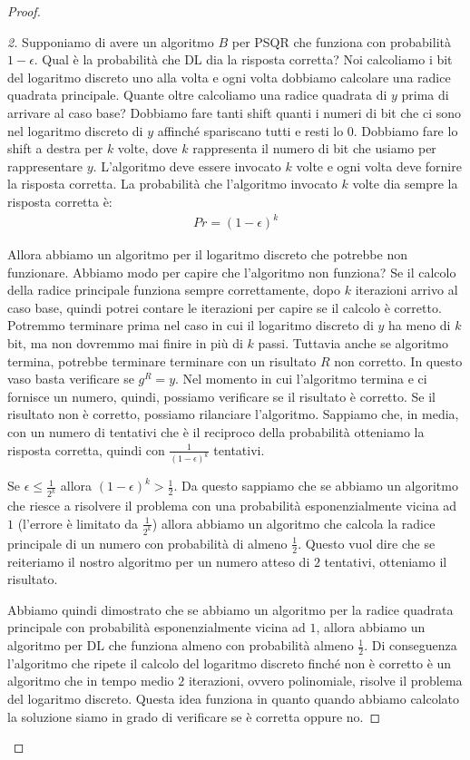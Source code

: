 \begin{proof}
\begin{proof}[2]
Supponiamo di avere un algoritmo $B$ per PSQR che funziona con probabilità $1 - \epsilon$. Qual è la probabilità che DL dia la risposta corretta? Noi calcoliamo i bit del logaritmo discreto uno alla volta e ogni volta dobbiamo calcolare una radice quadrata principale. Quante oltre calcoliamo una radice quadrata di $y$ prima di arrivare al caso base? Dobbiamo fare tanti shift quanti i numeri di bit che ci sono nel logaritmo discreto di $y$ affinché spariscano tutti e resti lo $0$. Dobbiamo fare lo shift a destra per $k$ volte, dove $k$ rappresenta il numero di bit che usiamo per rappresentare $y$. L'algoritmo deve essere invocato $k$ volte e ogni volta deve fornire la risposta corretta. La probabilità che l'algoritmo invocato $k$ volte dia sempre la risposta corretta è:
\begin{align*}
    Pr = (1-\epsilon)^k
\end{align*}

\noindent Allora abbiamo un algoritmo per il logaritmo discreto che potrebbe non funzionare. Abbiamo modo per capire che l'algoritmo non funziona? Se il calcolo della radice principale funziona sempre correttamente, dopo $k$ iterazioni arrivo al caso base, quindi potrei contare le iterazioni per capire se il calcolo è corretto. Potremmo terminare prima nel caso in cui il logaritmo discreto di $y$ ha meno di $k$ bit, ma non dovremmo mai finire in più di $k$ passi. Tuttavia anche se algoritmo termina, potrebbe terminare terminare con un risultato $R$ non corretto. In questo vaso basta verificare se $g^R = y$. Nel momento in cui l'algoritmo termina e ci fornisce un numero, quindi, possiamo verificare se il risultato è corretto. Se il risultato non è corretto, possiamo rilanciare l'algoritmo. Sappiamo che, in media, con un numero di tentativi che è il reciproco della probabilità otteniamo la risposta corretta, quindi con $\frac{1}{(1-\epsilon)^k}$ tentativi. 


Se $\epsilon \le \frac{1}{2^k}$ allora $(1-\epsilon)^k > \frac{1}{2}$. Da questo sappiamo che se abbiamo un algoritmo che riesce a risolvere il problema con una probabilità esponenzialmente vicina ad $1$ (l'errore è limitato da $\frac{1}{2^k}$) allora abbiamo un algoritmo che calcola la radice principale di un numero con probabilità di almeno $\frac{1}{2}$. Questo vuol dire che se reiteriamo il nostro algoritmo per un numero atteso di $2$ tentativi, otteniamo il risultato.

Abbiamo quindi dimostrato che se abbiamo un algoritmo per la radice quadrata principale con probabilità esponenzialmente vicina ad $1$, allora abbiamo un algoritmo per DL che funziona almeno con probabilità almeno $\frac{1}{2}$. Di conseguenza l'algoritmo che ripete il calcolo del logaritmo discreto finché non è corretto è un algoritmo che in tempo medio $2$ iterazioni, ovvero polinomiale, risolve il problema del logaritmo discreto. Questa idea funziona in quanto quando abbiamo calcolato la soluzione siamo in grado di verificare se è corretta oppure no. 
\end{proof}


\end{proof}

